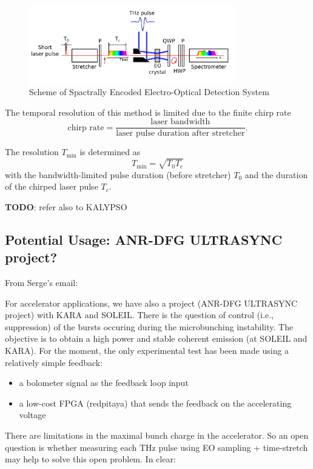 \begin{figure}[tbh]
	\centering
	\includegraphics[width = 0.8\textwidth]{chap/02-theory/img/spectral_eo}
	\caption{Scheme of Spactrally Encoded Electro-Optical Detection System \cite{roussel2014}}
	\label{fig:spectral_eo}
\end{figure}

The temporal resolution of this method is limited due to the finite chirp rate
\begin{equation}
	\text{chirp rate} = \frac{\text{laser bandwidth}}{\text{laser pulse duration after stretcher}}.
\end{equation}

The resolution $T_{\text{min}}$ is determined as
\begin{equation}
	T_{\text{min}} = \sqrt{T_0 T_c}
\end{equation}
with the bandwidth-limited pulse duration (before stretcher) $T_0$ and the duration of the chirped laser pulse $T_c$.


\textbf{TODO}: refer also to KALYPSO


\subsection{Potential Usage: ANR-DFG ULTRASYNC project?}
From Serge's email:

For accelerator applications, we have also a project (ANR-DFG ULTRASYNC project) with KARA and SOLEIL.
There is the question of control (i.e., suppression) of the bursts occuring during the microbunching instability. The objective is to obtain a high power and stable coherent emission (at SOLEIL and KARA). For the moment, the only experimental test has been made using a relatively simple feedback:
\begin{itemize}
	\item a bolometer signal as the feedback loop input
	\item a low-cost FPGA (redpitaya) that sends the feedback on the accelerating voltage
\end{itemize}

There are limitations in the maximal bunch charge in the accelerator. So an open question is whether measuring each THz pulse using EO sampling + time-stretch may help to solve this open problem. In clear:

